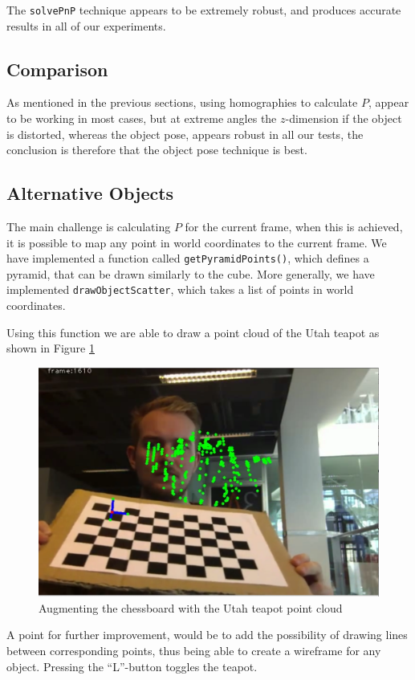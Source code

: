 \documentclass[a4paper,11pt]{article}
\begin{document}
The \texttt{solvePnP} technique appears to be extremely robust, and produces accurate results in all of our experiments.

\subsection{Comparison}
As mentioned in the previous sections, using homographies to calculate $P$, appear to be working in most cases, but at extreme angles the $z$-dimension if the object is distorted, whereas the object pose, appears robust in all our tests, the conclusion is therefore that the object pose technique is best.

\subsection{Alternative Objects}
The main challenge is calculating $P$ for the current frame, when this is achieved, it is possible to map any point in world coordinates to the current frame. We have implemented a function called \texttt{getPyramidPoints()}, which defines a pyramid, that can be drawn similarly to the cube. More generally, we have implemented \texttt{drawObjectScatter}, which takes a list of points in world coordinates.

Using this function we are able to draw a point cloud of the Utah teapot as shown in Figure \ref{fig:teapot}
\begin{figure}[H]
\centering
\includegraphics[width=0.6\linewidth]{teapot}
\caption{Augmenting the chessboard with the Utah teapot point cloud}
\label{fig:teapot}
\end{figure}

A point for further improvement, would be to add the possibility of drawing lines between corresponding points, thus being able to create a wireframe for any object. Pressing the “L”-button toggles the teapot.
\end{document}
